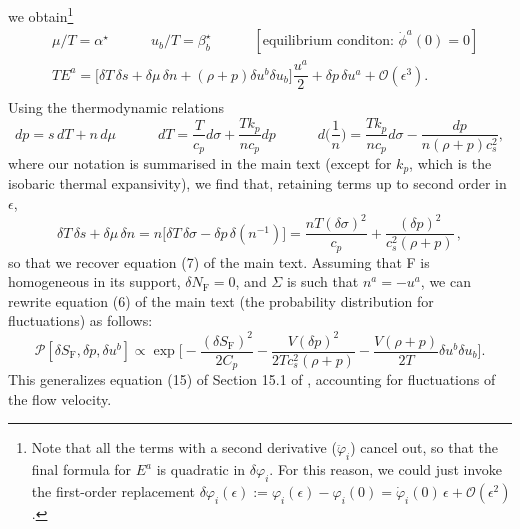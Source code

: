 \documentclass[aps,prl,reprint,nofootinbib]{revtex4-1}
\newcommand{\spc}{\quad \quad \quad}
\begin{document}
we obtain\footnote{Note that all the terms with a second derivative ($\ddot{\varphi}_i$) cancel out, so that the final formula for $E^a$ is quadratic in $\delta \varphi_i$. For this reason, we could just invoke the first-order replacement $\delta \varphi_i(\epsilon) :=\varphi_i(\epsilon)-\varphi_i(0)= \dot{\varphi}_i(0) \, \epsilon +\mathcal{O}(\epsilon^2)$.}
\begin{equation}
\begin{split}
& \mu/T = \alpha^\star  \spc u_b/T = \beta^\star_b  \spc [\text{equilibrium conditon: }\dot{\phi}^a(0)=0] \\
& TE^a = \bigg[ \delta T \, \delta s + \delta \mu \, \delta n  + (\rho+p)\delta u^b \delta u_b \bigg]\dfrac{u^a}{2} + \delta p \, \delta u^a +\mathcal{O}(\epsilon^3) . \\
\end{split}
\end{equation}
Using the thermodynamic relations
\begin{equation}
dp=s \, dT+n \,d\mu \spc dT=\dfrac{T}{c_p} d\sigma +\dfrac{Tk_p}{nc_p} dp  \spc d\bigg(\dfrac{1}{n}\bigg) = \dfrac{Tk_p}{nc_p} d\sigma-\dfrac{dp}{n(\rho+p)c_s^2},
\end{equation}
where our notation is summarised in the main text (except for $k_p$, which is the isobaric thermal expansivity), we find that, retaining terms up to second order in $\epsilon$,
\begin{equation}
 \delta T \, \delta s + \delta \mu \, \delta n =n \big[ \delta T \, \delta \sigma - \delta p \, \delta(n^{-1}) \big] = \dfrac{nT(\delta \sigma)^2}{c_p} + \dfrac{(\delta p)^2}{c_s^2(\rho+p)} \, ,
\end{equation}
so that we recover equation (7) of the main text. Assuming that F is homogeneous in its support, $\delta N_\text{F}=0$, and $\Sigma$ is such that $n^a=-u^a$, we can rewrite equation (6) of the main text (the probability distribution for fluctuations) as follows:
\begin{equation}
\mathcal{P}[\delta S_\text{F}, \delta p,\delta u^b]\propto \exp \bigg[ -\dfrac{(\delta S_\text{F})^2}{2C_p} -\dfrac{V(\delta p)^2}{2Tc_s^2 (\rho+p)} - \dfrac{V(\rho+p)}{2T}\delta u^b \delta u_b \bigg].
\end{equation}
This generalizes equation (15) of Section 15.1 of \citet{Pathria2011}, accounting for fluctuations of the flow velocity.





\newpage
\end{document}
